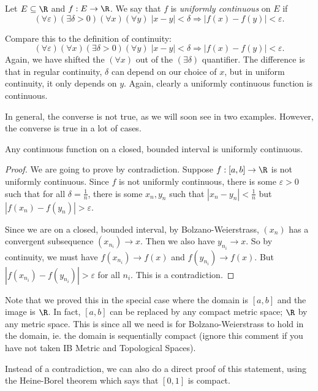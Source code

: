 \documentclass[a4paper]{article}
\begin{document}
\begin{defi}
  Let $E \subseteq \R$ and $f: E\to \R$. We say that $f$ is \emph{uniformly continuous} on $E$ if
  \[
    (\forall \varepsilon)(\exists \delta > 0)(\forall x)(\forall y)\; |x - y| < \delta \Rightarrow |f(x) - f(y)| < \varepsilon.
  \]
\end{defi}
Compare this to the definition of continuity:
\[
  (\forall \varepsilon)(\forall x)(\exists \delta > 0)(\forall y)\; |x - y| < \delta \Rightarrow |f(x) - f(y)| < \varepsilon.
\]
Again, we have shifted the $(\forall x)$ out of the $(\exists \delta)$ quantifier. The difference is that in regular continuity, $\delta$ can depend on our choice of $x$, but in uniform continuity, it only depends on $y$. Again, clearly a uniformly continuous function is continuous.

In general, the converse is not true, as we will soon see in two examples. However, the converse is true in a lot of cases.
\begin{thm}
  Any continuous function on a closed, bounded interval is uniformly continuous.
\end{thm}

\begin{proof}
  We are going to prove by contradiction. Suppose $f: [a, b] \to \R$ is not uniformly continuous. Since $f$ is not uniformly continuous, there is some $\varepsilon > 0$ such that for all $\delta = \frac{1}{n}$, there is some $x_n, y_n$ such that $|x_n - y_n| < \frac{1}{n}$ but $|f(x_n) - f(y_n)| > \varepsilon$.

  Since we are on a closed, bounded interval, by Bolzano-Weierstrass, $(x_n)$ has a convergent subsequence $(x_{n_i}) \to x$. Then we also have $y_{n_i}\to x$. So by continuity, we must have $f(x_{n_i}) \to f(x)$ and $f(y_{n_i}) \to f(x)$. But $|f(x_{n_i}) - f(y_{n_i})| > \varepsilon$ for all $n_i$. This is a contradiction.
\end{proof}
Note that we proved this in the special case where the domain is $[a, b]$ and the image is $\R$. In fact, $[a, b]$ can be replaced by any compact metric space; $\R$ by any metric space. This is since all we need is for Bolzano-Weierstrass to hold in the domain, ie. the domain is sequentially compact (ignore this comment if you have not taken IB Metric and Topological Spaces).

Instead of a contradiction, we can also do a direct proof of this statement, using the Heine-Borel theorem which says that $[0, 1]$ is compact.
\end{document}

